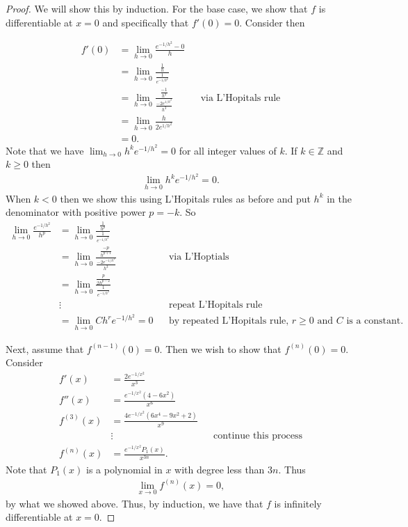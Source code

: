 \documentclass[leqno]{article}
\theoremstyle{nonumberplain}
\newtheorem{proof}{Proof}
\begin{document}
\begin{proof}
We will show this by induction. For the base case, we show that $f$ is differentiable at $x=0$ and specifically that $f'(0)=0$.  Consider then

\begin{align*}
f'(0)&=\lim_{h\to 0} \frac{e^{-1/h^2} - 0}{h}\\
&= \lim_{h\to 0} \frac{\frac{1}{h}}{\frac{1}{e^{-1/h^2}}}\\
&= \lim_{h\to 0} \frac{\frac{-1}{h^2}}{\frac{-2e^{1/h^2}}{h^3}} && \textrm{via L'Hopitals rule}\\
&= \lim_{h\to 0} \frac{h}{2e^{1/h^2}}\\
&= 0.
\end{align*}
Note that we have $\lim_{h\to 0} h^k e^{-1/h^2}=0$ for all integer values of $k$.  If $k\in \mathbb{Z}$ and $k\geq 0$ then
\begin{align*}
\lim_{h\to 0} h^k e^{-1/h^2}=0.
\end{align*}
When $k<0$ then we show this using L'Hopitals rules as before and put $h^k$ in the denominator with positive power $p=-k$.  So
\begin{align*}
\lim_{h\to 0} \frac{e^{-1/h^2}}{h^p}&= \lim_{h\to 0} \frac{\frac{1}{h^p}}{\frac{1}{e^{-1/h^2}}}\\
&= \lim_{h\to 0} \frac{\frac{-p}{h^{p+1}}}{\frac{-2e^{-1/h^2}}{h^3}} && \textrm{via L'Hoptials}\\
&= \lim_{h\to 0} \frac{\frac{p}{2h^{p-2}}}{\frac{1}{e^{-1/h^2}}}\\
&\vdots && \textrm{repeat L'Hopitals rule}\\
&= \lim_{h\to 0} Ch^r e^{-1/h^2}=0 && \textrm{by repeated L'Hopitals rule, $r\geq 0$ and $C$ is a constant.}
\end{align*}

Next, assume that $f^{(n-1)}(0)=0$.  Then we wish to show that $f^{(n)}(0)=0$.  Consider
\begin{align*}
f'(x)&=\frac{2e^{-1/x^2}}{x^3}\\
f''(x)&=\frac{e^{-1/x^2}(4-6x^2)}{x^6}\\
f^{(3)}(x)&= \frac{4e^{-1/x^2}(6x^4-9x^2+2)}{x^9}\\
&\vdots &&\textrm{continue this process}\\
f^{(n)}(x)&= \frac{e^{-1/x^2}P_1(x)}{x^{3n}}.
\end{align*}
Note that $P_1(x)$ is a polynomial in $x$ with degree less than $3n$.  Thus
\begin{align*}
\lim_{x\to 0} f^{(n)}(x) = 0,
\end{align*}
by what we showed above.  Thus, by induction, we have that $f$ is infinitely differentiable at $x=0$.

\end{proof}
\end{document}
